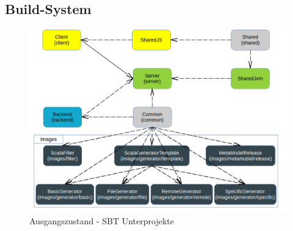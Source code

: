 \subsection{Build-System}
\label{sec:INITIAL_BUILD}

\begin{figure}
    \centering
    \includegraphics[width=5in]{figures/sbt-modules-before.png}
    \caption{Ausgangszustand - SBT Unterprojekte}
    \label{fig:ZETA_SBT_OLD}
\end{figure}

